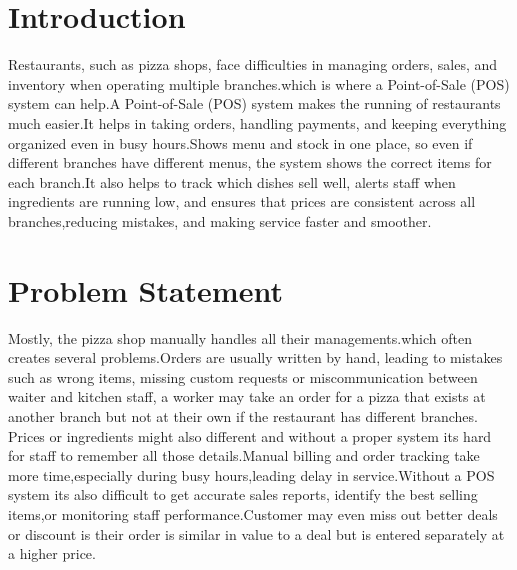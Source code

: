 \documentclass[12pt]{article}
\begin{document}
\section{Introduction}
Restaurants, such as pizza shops, face difficulties in managing orders, sales, and inventory when operating multiple branches.which is where a Point-of-Sale (POS) system can help.A Point-of-Sale (POS) system makes the running of restaurants much easier.It helps in taking orders, handling payments, and keeping everything organized even in busy hours.Shows menu and stock in one place, so even if different branches have different menus, the system  shows the correct items for each branch.It also helps to track which dishes sell well, alerts staff when ingredients are running low, and ensures that prices are consistent across all branches,reducing mistakes, and making service faster and smoother.
\section{Problem Statement}
Mostly, the pizza shop manually handles all their managements.which often creates several problems.Orders are usually written by hand, leading to mistakes such as wrong items, missing custom requests or miscommunication between waiter and kitchen staff, a worker may take an order for a pizza that exists at another branch but not at their own if the restaurant has different branches. Prices or ingredients might also different and without a proper system its hard for staff to remember all those details.Manual billing and order tracking take more time,especially during busy hours,leading delay in service.Without a POS system its also difficult to get accurate sales reports, identify the best selling items,or monitoring staff performance.Customer may even miss out better deals or discount is their order is similar in value to a deal but is entered separately at a higher price.
\end{document}
